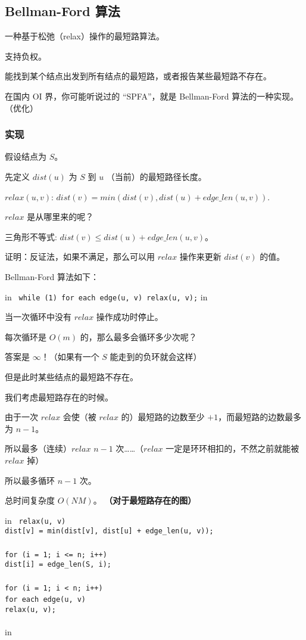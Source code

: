 \hr

\subsection{Bellman-Ford 算法}

一种基于松弛（relax）操作的最短路算法。

支持负权。

能找到某个结点出发到所有结点的最短路，或者报告某些最短路不存在。

在国内 OI 界，你可能听说过的 “SPFA”，就是 Bellman-Ford 算法的一种实现。（优化）

\subsubsection{实现}

假设结点为 $S$。

先定义 $dist(u)$ 为 $S$ 到 $u$ （当前）的最短路径长度。

$relax(u,v)$: $dist(v) = min(dist(v), dist(u) + edge\_len(u, v))$.

$relax$ 是从哪里来的呢？

三角形不等式: $dist(v) \leq dist(u) + edge\_len(u, v)$。

证明：反证法，如果不满足，那么可以用 $relax$ 操作来更新 $dist(v)$ 的值。

Bellman-Ford 算法如下：

 in
\texttt{
while (1) for each edge(u, v) relax(u, v);}
 in

当一次循环中没有 $relax$ 操作成功时停止。

每次循环是 $O(m)$ 的，那么最多会循环多少次呢？

答案是 $\infty$！（如果有一个 $S$ 能走到的负环就会这样）

但是此时某些结点的最短路不存在。

我们考虑最短路存在的时候。

由于一次 $relax$ 会使（被 $relax$ 的）最短路的边数至少 $+1$，而最短路的边数最多为 $n-1$。

所以最多（连续）$relax$ $n-1$ 次……（$relax$ 一定是环环相扣的，不然之前就能被 $relax$ 掉）

所以最多循环 $n-1$ 次。

总时间复杂度 $O(NM)$。 \textbf{（对于最短路存在的图）}

 in
\texttt{
relax(u, v) {\\	dist[v] = min(dist[v], dist[u] + edge_len(u, v));\\}\\for (i = 1; i <= n; i++) {\\	dist[i] = edge_len(S, i);\\}\\for (i = 1; i < n; i++) {\\	for each edge(u, v) {\\		relax(u, v);\\	}\\}}
 in

